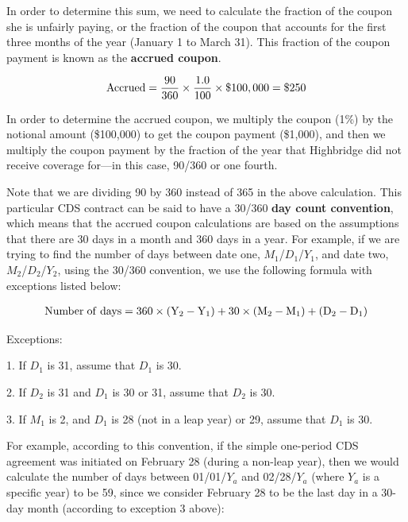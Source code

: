 \documentclass{jss}
\begin{document}
In order to determine this sum, we need to calculate the fraction of the coupon she is unfairly paying, or the fraction of the coupon that accounts for the first three months of the year (January 1 to March 31). This fraction of the coupon payment is known as the \textbf{accrued coupon}.

\begin{equation}
 \begin{aligned}
  {\rm Accrued = \frac{90}{360}\times\frac{1.0}{100}\times\$100,000 = \$250}
    \end{aligned}
\end{equation}

In order to determine the accrued coupon, we multiply the coupon (1\%) by the notional amount (\$100,000) to get the coupon payment (\$1,000), and then we multiply the coupon payment by the fraction of the year that Highbridge did not receive coverage for---in this case, 90/360 or one fourth. 

Note that we are dividing 90 by 360 instead of 365 in the above calculation. This particular CDS contract can be said to have a 30/360 \textbf{day count convention}, which means that the accrued coupon calculations are based on the assumptions that there are 30 days in a month and 360 days in a year. For example, if we are trying to find the number of days between date one, $M_1$/$D_1$/$Y_1$, and date two, $M_2$/$D_2$/$Y_2$, using the 30/360 convention, we use the following formula with exceptions listed below:

\begin{equation}
 \begin{aligned}
  {\rm Number\hspace{3pt}of\hspace{3pt}days = 360 \times (Y_{2} - Y_{1}) + 30 \times (M_{2} - M_{1}) + (D_{2} - D_{1})}
    \end{aligned}
\end{equation}


Exceptions:

1. If $D_1$ is 31, assume that $D_1$ is 30.

2. If $D_2$ is 31 and $D_1$ is 30 or 31, assume that $D_2$ is 30.

3. If $M_1$ is 2, and $D_1$ is 28 (not in a leap year) or 29, assume that $D_1$ is 30.

For example, according to this convention, if the simple one-period CDS agreement was initiated on February 28 (during a non-leap year), then we would calculate the number of days between 01/01/$Y_a$ and 02/28/$Y_a$ (where $Y_a$ is a specific year) to be 59, since we consider February 28 to be the last day in a 30-day month (according to exception 3 above):
\end{document}
